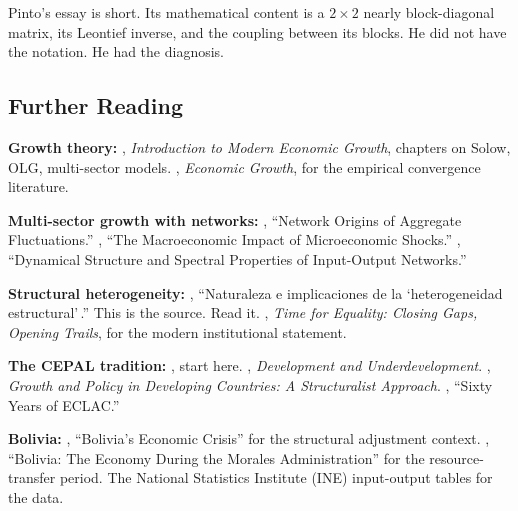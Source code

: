 \documentclass[../structural_economics_book.tex]{subfiles}
\begin{document}
Pinto's essay is short. Its mathematical content is a $2 \times 2$ nearly block-diagonal matrix, its Leontief inverse, and the coupling between its blocks. He did not have the notation. He had the diagnosis.


\subsection*{Further Reading}

\textbf{Growth theory:} \citet{acemoglu2009introduction}, \textit{Introduction to Modern Economic Growth}, chapters on Solow, OLG, multi-sector models. \citet{barro2004economic}, \textit{Economic Growth}, for the empirical convergence literature.

\textbf{Multi-sector growth with networks:} \citet{acemoglu2012network}, ``Network Origins of Aggregate Fluctuations.'' \citet{baqaee2019macroeconomic}, ``The Macroeconomic Impact of Microeconomic Shocks.'' \citet{liu2020dynamical}, ``Dynamical Structure and Spectral Properties of Input-Output Networks.''

\textbf{Structural heterogeneity:} \citet{pinto1970naturaleza}, ``Naturaleza e implicaciones de la `heterogeneidad estructural'\,.'' This is the source. Read it. \citet{cepal2010time}, \textit{Time for Equality: Closing Gaps, Opening Trails}, for the modern institutional statement.

\textbf{The CEPAL tradition:} \citet{prebisch1950economic}, start here. \citet{furtado1964development}, \textit{Development and Underdevelopment}. \citet{ocampo2009growth}, \textit{Growth and Policy in Developing Countries: A Structuralist Approach}. \citet{bielschowsky2009sixty}, ``Sixty Years of ECLAC.''

\textbf{Bolivia:} \citet{morales1990bolivias}, ``Bolivia's Economic Crisis'' for the structural adjustment context. \citet{weisbrot2009bolivia}, ``Bolivia: The Economy During the Morales Administration'' for the resource-transfer period. The National Statistics Institute (INE) input-output tables for the data.
\end{document}
